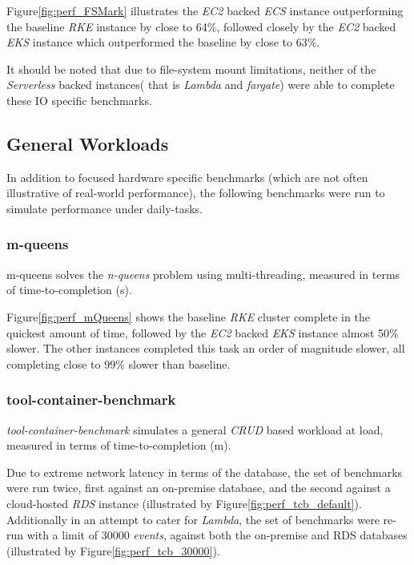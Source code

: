 Figure\ref{fig:perf_FSMark} illustrates the \textit{EC2} backed \textit{ECS} instance outperforming the baseline \textit{RKE} instance by close to 64\%,
followed closely by the \textit{EC2} backed \textit{EKS} instance which outperformed the baseline by close to 63\%.

\noindent \newline It should be noted that due to file-system mount limitations, neither of the \textit{Serverless} backed instances( that is \textit{Lambda} and \textit{fargate}) were able to complete these I\/O specific benchmarks.

\subsection{General Workloads}
In addition to focused hardware specific benchmarks (which are not often illustrative of real-world performance),
the following benchmarks were run to simulate performance under daily-tasks.

\subsubsection{m-queens}
m-queens solves the \emph{n-queens} problem using multi-threading, measured in terms of time-to-completion (s).

Figure\ref{fig:perf_mQueens} shows the baseline \textit{RKE} cluster complete in the quickest amount of time,
followed by the \textit{EC2} backed \textit{EKS} instance almost 50\% slower.
The other instances completed this task an order of magnitude slower, all completing close to 99\% slower than baseline.

\subsubsection{tool-container-benchmark}
\emph{tool-container-benchmark} simulates a general \textit{CRUD} based workload at load, measured in terms of time-to-completion (m).

Due to extreme network latency in terms of the database, the set of benchmarks were run twice,
first against an on-premise database, and the second against a cloud-hosted \textit{RDS} instance (illustrated by Figure\ref{fig:perf_tcb_default}).
Additionally in an attempt to cater for \textit{Lambda}, the set of benchmarks were re-run with a limit of 30000 \emph{events},
against both the on-premise and RDS databases
(illustrated by Figure\ref{fig:perf_tcb_30000}).

